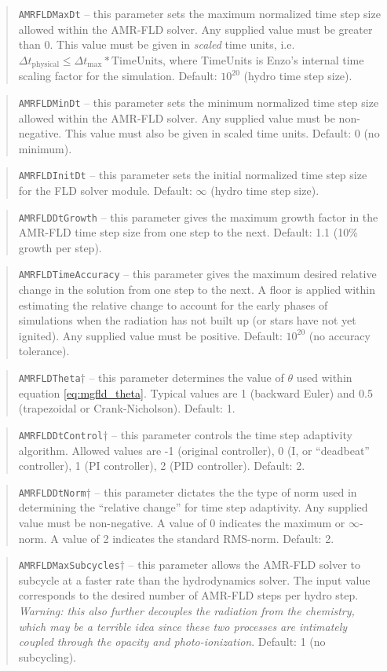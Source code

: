 \documentclass[10pt]{article}
\renewcommand{\(}{\left(}
\renewcommand{\)}{\right)}
\newcommand{\dt}{\Delta t}
\begin{document}
\blockquote{{\tt AMRFLDMaxDt} -- this parameter sets the maximum
  normalized time step size allowed within the AMR-FLD solver.  Any
  supplied value must be greater than 0.  This value must be given in
  {\em scaled} time units, i.e.~$\dt_{\text{physical}} \le
  \dt_{\text{max}}*\text{TimeUnits}$, where TimeUnits is Enzo's
  internal time scaling factor for the simulation. Default: $10^{20}$
  (hydro time step size).}
%
\blockquote{{\tt AMRFLDMinDt} -- this parameter sets the minimum
  normalized time step size allowed within the AMR-FLD solver.  Any
  supplied value must be non-negative.  This value must also be given
  in scaled time units. Default: 0 (no minimum).}
%
\blockquote{{\tt AMRFLDInitDt} -- this parameter sets the initial
  normalized time step size for the FLD solver module.  Default:
  $\infty$ (hydro time step size).}
%
\blockquote{{\tt AMRFLDDtGrowth} -- this parameter gives the maximum
  growth factor in the AMR-FLD time step size from one step to the
  next.  Default: 1.1 (10\% growth per step).}
%
\blockquote{{\tt AMRFLDTimeAccuracy} -- this parameter gives the
  maximum desired relative change in the solution from one step to the
  next.  A floor is applied within estimating the relative change to
  account for the early phases of simulations when the radiation has
  not built up (or stars have not yet ignited).  Any supplied value
  must be positive.  Default: $10^{20}$ (no accuracy tolerance).}
%
\blockquote{{\tt AMRFLDTheta}$\dagger$ -- this parameter determines
  the value of $\theta$ used within equation \eqref{eq:mgfld_theta}.
  Typical values are 1 (backward Euler) and 0.5 (trapezoidal or
  Crank-Nicholson).  Default: 1.}
%
\blockquote{{\tt AMRFLDDtControl}$\dagger$ -- this parameter controls
  the time step adaptivity algorithm.  Allowed values are -1 (original
  controller), 0 (I, or ``deadbeat'' controller), 1 (PI controller), 2
  (PID controller).  Default: 2.}
%
\blockquote{{\tt AMRFLDDtNorm}$\dagger$ -- this parameter dictates the
  the type of norm used in determining the ``relative change'' for
  time step adaptivity.  Any supplied value must be non-negative.  A
  value of 0 indicates the maximum or $\infty$-norm.  A value of 2
  indicates the standard RMS-norm.  Default: 2.}
%
\blockquote{{\tt AMRFLDMaxSubcycles}$\dagger$ -- this parameter allows
  the AMR-FLD solver to subcycle at a faster rate than the
  hydrodynamics solver.  The input value corresponds to the desired
  number of AMR-FLD steps per hydro step.  {\em Warning: this also
  further decouples the radiation from the chemistry, which may be a
  terrible idea since these two processes are intimately coupled
  through the opacity and photo-ionization}.  Default: 1 (no subcycling).}
\end{document}
